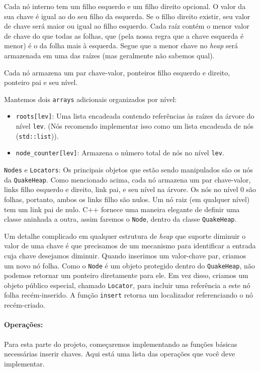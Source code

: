 \documentclass{article}
\begin{document}
Cada nó interno tem um filho esquerdo e um filho direito opcional. O valor da sua chave é igual ao do seu filho da esquerda. Se o filho direito existir, seu valor de chave será maior ou igual ao filho esquerdo. Cada raíz contém o menor valor de chave do que todas as folhas, que (pela nossa regra que a chave esquerda é menor) é o da folha mais à esquerda. Segue que a menor chave no \textit{heap} será armazenada em uma das raízes (mas geralmente não sabemos qual).

Cada nó armazena um par chave-valor, ponteiros filho esquerdo e direito, ponteiro pai e seu nível. 

Mantemos dois \texttt{arrays} adicionais organizados por nível:
\begin{itemize}
    \item \texttt{roots[lev]}: Uma lista encadeada contendo referências às raízes da árvore do nível \texttt{lev}. (Nós recomendo implementar isso como um lista encadeada de nós (\texttt{std::list})).
    \item \texttt{node\_counter[lev]}: Armazena o número total de nós no nível \texttt{lev}.
\end{itemize}

\texttt{Nodes} e \texttt{Locators}: Os principais objetos que estão sendo manipulados são os nós da \texttt{QuakeHeap}. Como mencionado acima, cada nó armazena um par chave-valor, links filho esquerdo e direito, link pai,
e seu nível na árvore. Os nós no nível 0 são folhas, portanto, ambos os links filho são nulos. Um nó raiz (em qualquer nível) tem um link pai de nulo. C++ fornece uma maneira elegante de definir uma classe aninhada a outra, assim faremos o \texttt{Node}, dentro da classe \texttt{QuakeHeap}.

Um detalhe complicado em qualquer estrutura de \textit{heap} que suporte diminuir o valor de uma chave é que precisamos de um mecanismo para identificar a entrada cuja chave desejamos diminuir. Quando inserimos um valor-chave
par, criamos um novo nó folha. Como o \texttt{Node} é um objeto protegido dentro do \texttt{QuakeHeap}, não podemos retornar um ponteiro diretamente para ele. Em vez disso, criamos um objeto público especial, chamado \texttt{Locator},
para incluir uma referência a este nó folha recém-inserido. A função \texttt{insert} retorna um localizador referenciando o nó recém-criado. 

\paragraph{Operações:} Para esta parte do projeto, começaremos implementando as funções básicas necessárias inserir chaves. Aqui está uma lista das operações que você deve implementar.
\end{document}
